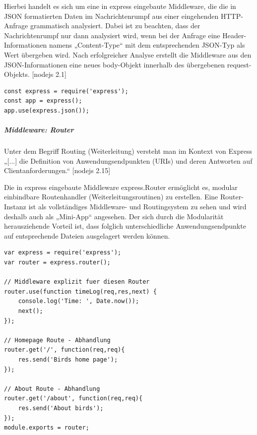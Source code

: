 \noindent
Hierbei handelt es sich um eine in express eingebaute Middleware, die die in JSON formatierten Daten im Nachrichtenrumpf aus einer eingehenden HTTP-Anfrage grammatisch analysiert.  Dabei ist zu beachten, dass der Nachrichtenrumpf nur dann analysiert wird, wenn bei der Anfrage eine Header-Informationen namens „Content-Type“ mit dem entsprechenden JSON-Typ als Wert übergeben wird. Nach erfolgreicher Analyse erstellt die Middleware aus den JSON-Informationen eine neues body-Objekt innerhalb des übergebenen request-Objekts. [nodejs 2.1]
\newline

\begin{lstlisting}[caption=Express.json Middleware benutzen,label=lst:ExpressNutzen]
const express = require('express');
const app = express();
app.use(express.json());
\end{lstlisting}

%
%

\newpage
\noindent
\subparagraph{Middleware: Router}

\noindent
Unter dem Begriff Routing (Weiterleitung) versteht man im Kontext von Express „[...] die Definition von Anwendungsendpunkten (URIs) und deren Antworten auf Clientanforderungen.“ [nodejs 2.15]
\newline

\noindent
Die in express eingebaute Middleware express.Router ermöglicht es, modular einbindbare Routenhandler (Weiterleitungsroutinen) zu erstellen. Eine Router-Instanz ist als vollständiges Middleware- und Routingsystem zu sehen und wird deshalb auch als „Mini-App“ angesehen. Der sich durch die Modularität herausziehende Vorteil ist, dass folglich unterschiedliche Anwendungsendpunkte auf entsprechende Dateien ausgelagert werden können.
\newline



\begin{lstlisting}[caption=Routinghandler erstellen \protect \footnotemark,label=lst:RoutingHandlerCreate]
var express = require('express');
var router = express.router();

// Middleware explizit fuer diesen Router
router.use(function timeLog(req,res,next) {
	console.log('Time: ', Date.now());
	next();
});

// Homepage Route - Abhandlung
router.get('/', function(req,req){
	res.send('Birds home page');
});

// About Route - Abhandlung
router.get('/about', function(req,req){
	res.send('About birds');
});
module.exports = router;
\end{lstlisting}

